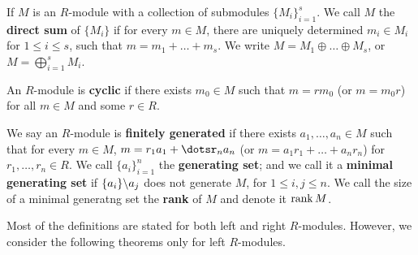 \begin{definition}
    If $M$ is an  $R$-module with a collection of submodules $\{M_i\}_{i=1}^s$. We call $M$ the
    \textbf{direct sum} of $\{M_i\}$ if for every $m \in M$, there are uniquely determined  $m_i \in
    M_i$ for  $1 \leq i \leq s$, such that  $m=m_1+\dots+m_s$. We write $M=M_1 \oplus \dots \oplus
    M_s$, or $M=\bigoplus_{i=1}^s{M_i}$.
\end{definition}

\begin{definition}
    An $R$-module is \textbf{cyclic} if there exists $m_0 \in M$ such that $m=rm_0$ (or $m=m_0r$)
    for all $m \in M$ and some  $r \in R$.
\end{definition}

\begin{definition}
    We say an $R$-module is  \textbf{finitely generated} if there exists $a_1,\dots ,a_n \in M$ such
    that for every $m \in M$,  $m=r_1a_1+\dotsr_na_n$ (or $m=a_1r_1+\dots+a_nr_n$) for $r_1, \dots,
    r_n \in R$. We call $\{a_i\}_{i=1}^n$ the \textbf{generating set}; and we call it a
    \textbf{minimal generating set} if $\{a_i\} \backslash a_j$ does not generate $M$, for  $1 \leq i,j
    \leq n$. We call the size of a minimal generatng set the  \textbf{rank} of $M$ and denote it
    $\rank{M}$.
\end{definition}

Most of the definitions are stated for both left and right $R$-modules. However, we consider the
following theorems only for left $R$-modules.
